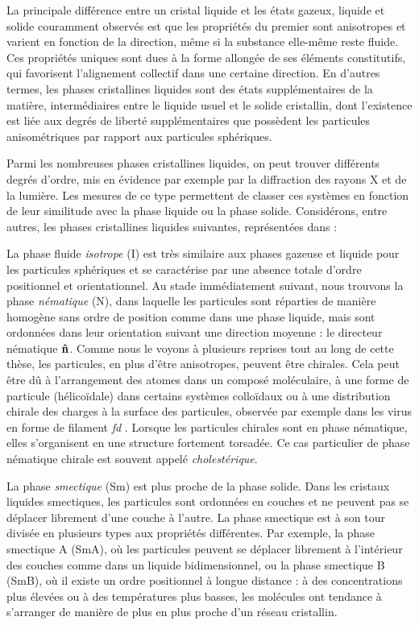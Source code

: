 La principale différence entre un cristal liquide et les états gazeux, liquide et solide couramment observés est que les propriétés du premier sont anisotropes et varient en fonction de la direction, même si la substance elle-même reste fluide. Ces propriétés uniques sont dues à la forme allongée de ses éléments constitutifs, qui favorisent l'alignement collectif dans une certaine direction. En d'autres termes, les phases cristallines liquides sont des états supplémentaires de la matière, intermédiaires entre le liquide usuel et le solide cristallin, dont l'existence est liée aux degrés de liberté supplémentaires que possèdent les particules anisométriques par rapport aux particules sphériques.


Parmi les nombreuses phases cristallines liquides, on peut trouver différents degrés d'ordre, mis en évidence par exemple par la diffraction des rayons X et de la lumière. Les mesures de ce type permettent de classer ces systèmes en fonction de leur similitude avec la phase liquide ou la phase solide. Considérons, entre autres, les phases cristallines liquides suivantes, représentées dans  :

La phase fluide {\em isotrope} (I) est très similaire aux phases gazeuse et liquide pour les particules sphériques et se caractérise par une absence totale d'ordre positionnel et orientationnel. Au stade immédiatement suivant, nous trouvons la phase {\em nématique} (N), dans laquelle les particules sont réparties de manière homogène sans ordre de position comme dans une phase liquide, mais sont ordonnées dans leur orientation suivant une direction moyenne : le directeur nématique ${\bf \hat{n}}$. Comme nous le voyons à plusieurs reprises tout au long de cette thèse, les particules, en plus d'être anisotropes, peuvent être chirales. Cela peut être dû à l'arrangement des atomes dans un composé moléculaire, à une forme de particule (hélicoïdale) dans certains systèmes colloïdaux ou à une distribution chirale des charges à la surface des particules, observée par exemple dans  les virus en forme de filament {\em fd} \cite{Gibaud_2017}. Lorsque les particules chirales sont en phase nématique, elles s'organisent en une structure fortement torsadée. Ce cas particulier de phase nématique chirale est souvent appelé {\em cholestérique}.

La phase {\em smectique} (Sm) est plus proche de la phase solide. Dans les cristaux liquides smectiques, les particules sont ordonnées en couches et ne peuvent pas se déplacer librement d'une couche à l'autre. La phase smectique est à son tour divisée en plusieurs types aux propriétés différentes. Par exemple, la phase smectique A (SmA), où les particules peuvent se déplacer librement à l'intérieur des couches comme dans un liquide bidimensionnel, ou la phase smectique B (SmB), où il existe un ordre positionnel à longue distance : à des concentrations plus élevées ou à des températures plus basses, les molécules ont tendance à s'arranger de manière de plus en plus proche d'un réseau cristallin.

